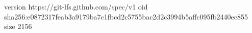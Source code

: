 version https://git-lfs.github.com/spec/v1
oid sha256:e0872317feab3a9179ba7c1fbcd2c5755bac2d2c3994b5affc095fb2440ec855
size 2156
